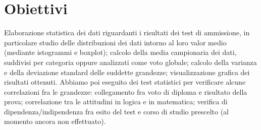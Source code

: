 \section{Obiettivi}

Elaborazione statistica dei dati riguardanti i risultati dei test di ammissione,
in particolare studio delle distribuzioni dei dati intorno al loro valor medio
(mediante istogrammi e boxplot); calcolo della media campionaria dei dati,
suddivisi per categoria oppure analizzati come voto globale; calcolo della varianza
e della deviazione standard delle suddette grandezze; visualizzazione grafica
dei risultati ottenuti. Abbiamo poi eseguito dei test statistici per verificare
alcune correlazioni fra le grandezze: collegamento fra voto di diploma e risultato
della prova; correlazione tra le attitudini in logica e in matematica; verifica
di dipendenza/indipendenza fra esito del test e corso di studio prescelto (al
momento ancora non effettuato).

